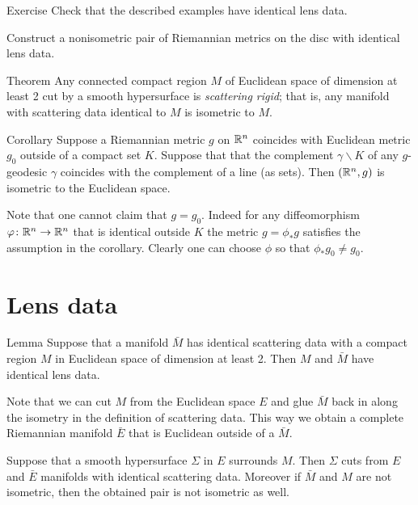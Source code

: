\begin{thm}{Exercise}
Check that the described examples have identical lens data.

Construct a nonisometric pair of Riemannian metrics on the disc with identical lens data.
\end{thm}

\begin{thm}{Theorem}\label{thm:magic-cloak}
Any connected compact region $M$ of Euclidean space of dimension at least 2 cut by a smooth hypersurface is \emph{scattering rigid};
that is, any manifold with scattering data identical to $M$ is isometric to $M$.
\end{thm}

\begin{thm}{Corollary}
Suppose a Riemannian metric $g$ on $\mathbb{R}^n$ coincides with Euclidean metric $g_0$ outside of a compact set $K$.
Suppose that that the complement $\gamma\backslash K$ of any $g$-geodesic $\gamma$ coincides with the complement of a line (as sets).
Then $(\mathbb{R}^n,g)$ is isometric to the Euclidean space.
\end{thm}

Note that one cannot claim that $g=g_0$.
Indeed for any diffeomorphism $\varphi\colon\mathbb{R}^n\to\mathbb{R}^n$ that is identical outside $K$ the metric $g=\phi_*g$ satisfies the assumption in the corollary.
Clearly one can choose $\phi$ so that $\phi_*g_0\ne g_0$.


\section{Lens data}

\begin{thm}{Lemma}\label{lem:no-delay}
Suppose that a manifold $\bar M$ has identical scattering data with a compact region $M$ in Euclidean space of dimension at least 2.
Then $M$ and $\bar M$ have identical lens data. 
\end{thm}

Note that we can cut $M$ from the Euclidean space $E$ and glue $\bar M$ back in along the isometry in the definition of scattering data.
This way we obtain a complete Riemannian manifold $\bar E$ that is Euclidean outside of a $\bar M$.

Suppose that a smooth hypersurface $\Sigma$ in $E$ surrounds $M$.
Then $\Sigma$ cuts from $E$ and $\bar E$ manifolds with identical scattering data.
Moreover if $\bar M$ and $M$ are not isometric,
then the obtained pair is not isometric as well.

